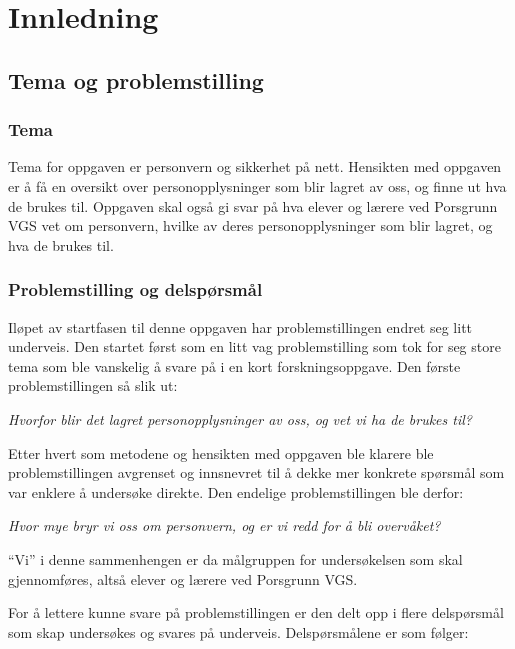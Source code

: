 \section{Innledning}

\subsection{Tema og problemstilling}\label{subsec:problemstilling}

\subsubsection{Tema}
Tema for oppgaven er personvern og sikkerhet på nett. Hensikten med oppgaven er å få en oversikt over personopplysninger som blir lagret av oss, og finne ut hva de brukes til. Oppgaven skal også gi svar på hva elever og lærere ved Porsgrunn VGS vet om personvern, hvilke av deres personopplysninger som blir lagret, og hva de brukes til.

\subsubsection{Problemstilling og delspørsmål}\label{subsubsec:problemstilling}
Iløpet av startfasen til denne oppgaven har problemstillingen endret seg litt underveis. Den startet først som en litt vag problemstilling som tok for seg store tema som ble vanskelig å svare på i en kort forskningsoppgave. Den første problemstillingen så slik ut:

\textit{Hvorfor blir det lagret personopplysninger av oss, og vet vi ha de brukes til?}

Etter hvert som metodene og hensikten med oppgaven ble klarere ble problemstillingen avgrenset og innsnevret til å dekke mer konkrete spørsmål som var enklere å undersøke direkte. Den endelige problemstillingen ble derfor:

\textit{Hvor mye bryr vi oss om personvern, og er vi redd for å bli overvåket?}

``Vi'' i denne sammenhengen er da målgruppen for undersøkelsen som skal gjennomføres, altså elever og lærere ved Porsgrunn VGS. 

For å lettere kunne svare på problemstillingen er den delt opp i flere delspørsmål som skap undersøkes og svares på underveis. Delspørsmålene er som følger:

